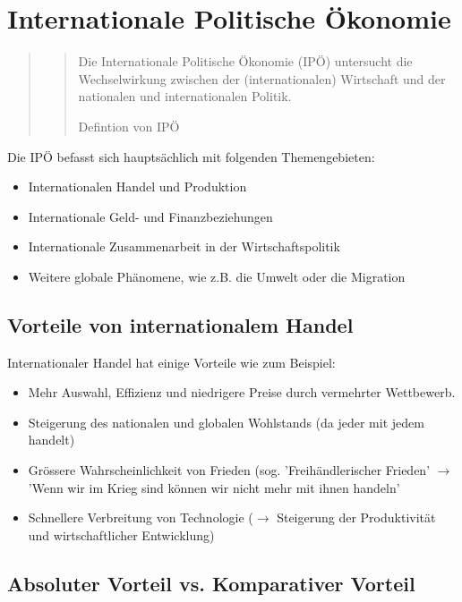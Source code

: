 \documentclass[a4paper, 11pt]{article}
\begin{document}
\section{Internationale Politische Ökonomie}

\begin{quote}
	\centering
	\blockquote[Defintion von IPÖ]{Die Internationale Politische Ökonomie (IPÖ) untersucht die Wechselwirkung zwischen der (internationalen) Wirtschaft und der nationalen und internationalen Politik.}
\end{quote}

Die IPÖ befasst sich hauptsächlich mit folgenden Themengebieten:

\begin{itemize}
	\item Internationalen Handel und Produktion
	\item Internationale Geld- und Finanzbeziehungen
	\item Internationale Zusammenarbeit in der Wirtschaftspolitik
	\item Weitere globale Phänomene, wie z.B. die Umwelt oder die Migration
\end{itemize}

\subsection{Vorteile von internationalem Handel}

Internationaler Handel hat einige Vorteile wie zum Beispiel:

\begin{itemize}
	\item Mehr Auswahl, Effizienz und niedrigere Preise durch vermehrter Wettbewerb.
	\item Steigerung des nationalen und globalen Wohlstands (da jeder mit jedem handelt)
	\item Grössere Wahrscheinlichkeit von Frieden (sog. 'Freihändlerischer Frieden' $\rightarrow$ 'Wenn wir im Krieg sind können wir nicht mehr mit ihnen handeln'
	\item Schnellere Verbreitung von Technologie ($\rightarrow$ Steigerung der Produktivität und wirtschaftlicher Entwicklung)
\end{itemize}

\subsection{Absoluter Vorteil vs. Komparativer Vorteil}
\end{document}
